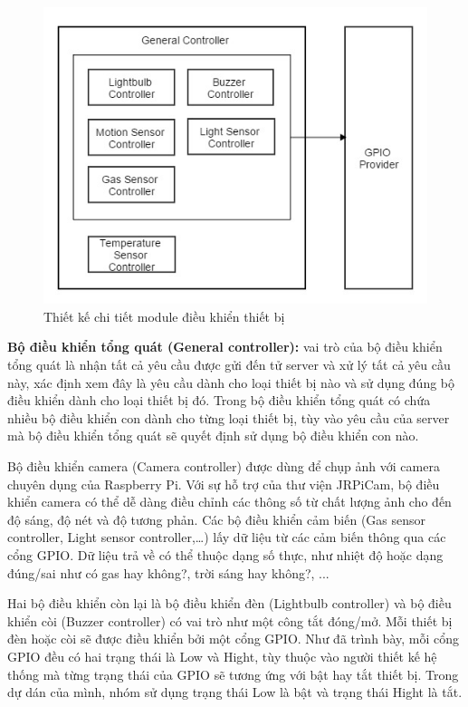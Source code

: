 \documentclass[11pt,a4paper,oneside]{book}
\begin{document}
\begin{figure}[h]
  \centering
     \includegraphics[scale=0.5]{4-module-dieu-khien-detail}
  \caption{Thiết kế chi tiết module điều khiển thiết bị}\label{fig:4-module-dieu-khien-detail}
\end{figure}

\textbf{Bộ điều khiển tổng quát (General controller):} vai trò của bộ điều khiển tổng quát là nhận tất cả yêu cầu được gửi đến tử server và xử lý tất cả yêu cầu này, xác định xem đây là yêu cầu dành cho loại thiết bị nào và sử dụng đúng bộ điều khiển dành cho loại thiết bị đó. Trong bộ điều khiển tổng quát có chứa nhiều bộ điều khiển con dành cho từng loại thiết bị, tùy vào yêu cầu của server mà bộ điều khiển tổng quát sẽ quyết định sử dụng bộ điều khiển con nào. 

Bộ điều khiển camera (Camera controller) được dùng để chụp ảnh với camera chuyên dụng của Raspberry Pi. Với sự hỗ trợ của thư viện JRPiCam, bộ điều khiển camera có thể dễ dàng điều chỉnh các thông số từ chất lượng ảnh cho đến độ sáng, độ nét và độ tương phản. Các bộ điều khiển cảm biến (Gas sensor controller, Light sensor controller,…) lấy dữ liệu từ các cảm biến thông qua các cổng GPIO. Dữ liệu trả về có thể thuộc dạng số thực, như nhiệt độ hoặc dạng đúng/sai như có gas hay không?, trời sáng hay không?, ...

Hai bộ điều khiển còn lại là bộ điều khiển đèn (Lightbulb controller) và bộ điều khiển còi (Buzzer controller) có vai trò như một công tắt đóng/mở. Mỗi thiết bị đèn hoặc còi sẽ được điều khiển bởi một cổng GPIO. Như đã trình bày, mỗi cổng GPIO đều có hai trạng thái là Low và Hight, tùy thuộc vào người thiết kế hệ thống mà từng trạng thái của GPIO sẽ tương ứng với bật hay tắt thiết bị. Trong dự dán của mình, nhóm sử dụng trạng thái Low là bật và trạng thái Hight là tắt.
\end{document}
